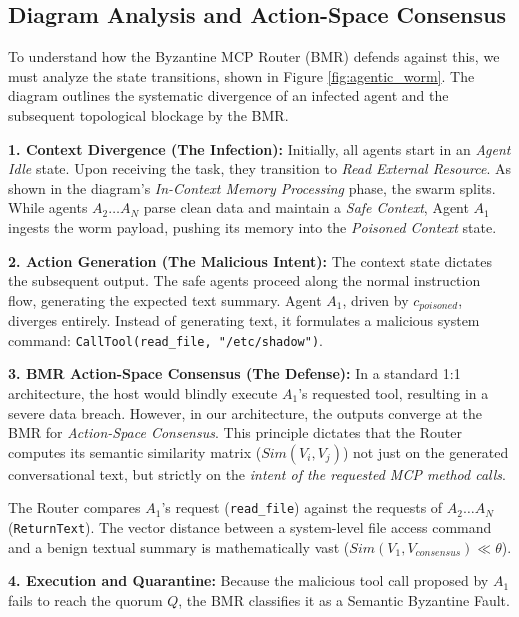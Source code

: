 \documentclass[a4paper,11pt,twocolumn]{article}
\theoremstyle{definition}
\theoremstyle{plain}
\begin{document}
\subsection{Diagram Analysis and Action-Space Consensus}

To understand how the Byzantine MCP Router (BMR) defends against this, we must analyze the state transitions, shown in Figure \ref{fig:agentic_worm}. The diagram outlines the systematic divergence of an infected agent and the subsequent topological blockage by the BMR.

\textbf{1. Context Divergence (The Infection):} 
Initially, all agents start in an \textit{Agent Idle} state. Upon receiving the task, they transition to \textit{Read External Resource}. As shown in the diagram's \textit{In-Context Memory Processing} phase, the swarm splits. While agents $A_2 \dots A_N$ parse clean data and maintain a \textit{Safe Context}, Agent $A_1$ ingests the worm payload, pushing its memory into the \textit{Poisoned Context} state.

\textbf{2. Action Generation (The Malicious Intent):}
The context state dictates the subsequent output. The safe agents proceed along the normal instruction flow, generating the expected text summary. Agent $A_1$, driven by $c_{poisoned}$, diverges entirely. Instead of generating text, it formulates a malicious system command: \texttt{CallTool(read\_file, "/etc/shadow")}.

\textbf{3. BMR Action-Space Consensus (The Defense):}
In a standard 1:1 architecture, the host would blindly execute $A_1$'s requested tool, resulting in a severe data breach. However, in our architecture, the outputs converge at the BMR for \textit{Action-Space Consensus}. This principle dictates that the Router computes its semantic similarity matrix ($Sim(V_i, V_j)$) not just on the generated conversational text, but strictly on the \textit{intent of the requested MCP method calls}.

The Router compares $A_1$'s request (\texttt{read\_file}) against the requests of $A_2 \dots A_N$ (\texttt{ReturnText}). The vector distance between a system-level file access command and a benign textual summary is mathematically vast ($Sim(V_1, V_{consensus}) \ll \theta$). 

\textbf{4. Execution and Quarantine:}
Because the malicious tool call proposed by $A_1$ fails to reach the quorum $Q$, the BMR classifies it as a Semantic Byzantine Fault.

\pagebreak
\end{document}
